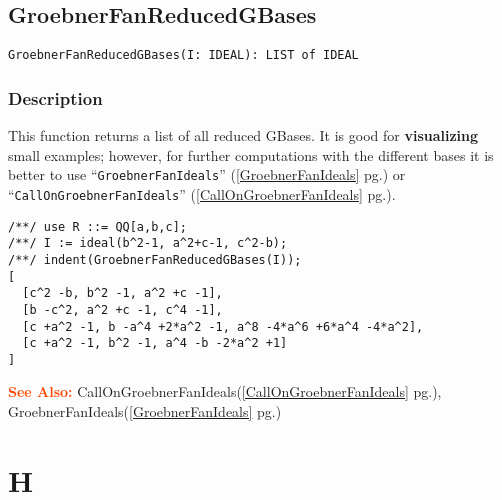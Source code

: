 \documentclass[a4paper]{mybook}
\newenvironment{command}{}{} %
\newcommand\SeeAlso{\par\textcolor{OrangeRed}{\textbf{\large See Also: }}}
\begin{document}
\section{GroebnerFanReducedGBases}
\label{GroebnerFanReducedGBases}
\begin{command} %


\begin{Verbatim}[label=syntax, rulecolor=\color{MidnightBlue},
frame=single]
GroebnerFanReducedGBases(I: IDEAL): LIST of IDEAL
\end{Verbatim}


\subsection*{Description}

This function returns a list of all reduced GBases.  It is good for
\textbf{visualizing} small examples; however, for further computations
with the different bases it is better to use ``\verb&GroebnerFanIdeals&'' (\ref{GroebnerFanIdeals} pg.\pageref{GroebnerFanIdeals})
or ``\verb&CallOnGroebnerFanIdeals&'' (\ref{CallOnGroebnerFanIdeals} pg.\pageref{CallOnGroebnerFanIdeals}).
\begin{Verbatim}[label=example, rulecolor=\color{PineGreen}, frame=single]
/**/ use R ::= QQ[a,b,c];
/**/ I := ideal(b^2-1, a^2+c-1, c^2-b);
/**/ indent(GroebnerFanReducedGBases(I));
[
  [c^2 -b, b^2 -1, a^2 +c -1],
  [b -c^2, a^2 +c -1, c^4 -1],
  [c +a^2 -1, b -a^4 +2*a^2 -1, a^8 -4*a^6 +6*a^4 -4*a^2],
  [c +a^2 -1, b^2 -1, a^4 -b -2*a^2 +1]
]
\end{Verbatim}


\SeeAlso %
  CallOnGroebnerFanIdeals(\ref{CallOnGroebnerFanIdeals} pg.\pageref{CallOnGroebnerFanIdeals}), 
    GroebnerFanIdeals(\ref{GroebnerFanIdeals} pg.\pageref{GroebnerFanIdeals})
\end{command} %

\chapter{H}  %
\label{H}
\end{document}
